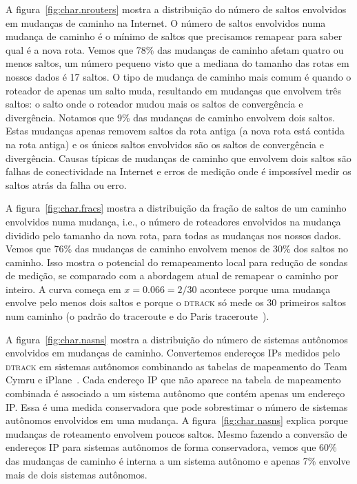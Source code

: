 \documentclass{JBCS}
\newcommand{\dtrack}{\textsc{dtrack}}
\newcommand{\figstr}{figura}
\begin{document}
A \figstr~\ref{fig:char.nrouters} mostra a distribuição do número de
saltos envolvidos em mudanças de caminho na Internet.  O número de
saltos envolvidos numa mudança de caminho é o mínimo de saltos que
precisamos remapear para saber qual é a nova rota.  Vemos que 78\% das
mudanças de caminho afetam quatro ou menos saltos, um número pequeno
visto que a mediana do tamanho das rotas em nossos dados é 17 saltos.  O
tipo de mudança de caminho mais comum é quando o roteador de apenas um
salto muda, resultando em mudanças que envolvem três saltos: o salto
onde o roteador mudou mais os saltos de convergência e divergência.
Notamos que 9\% das mudanças de caminho envolvem dois saltos.  Estas
mudanças apenas removem saltos da rota antiga (a nova rota está contida
na rota antiga) e os únicos saltos envolvidos são os saltos de
convergência e divergência.  Causas típicas de mudanças de caminho que
envolvem dois saltos são falhas de conectividade na Internet e erros de
medição onde é impossível medir os saltos atrás da falha ou erro.  

A \figstr~\ref{fig:char.fracs} mostra a distribuição da fração de saltos
de um caminho envolvidos numa mudança, i.e., o número de roteadores
envolvidos na mudança dividido pelo tamanho da nova rota, para todas as
mudanças nos nossos dados.  Vemos que 76\% das mudanças de caminho
envolvem menos de 30\% dos saltos no caminho.  Isso mostra o potencial
do remapeamento local para redução de sondas de medição, se comparado
com a abordagem atual de remapear o caminho por inteiro.  A curva começa
em $x = 0.066 = 2/30$ acontece porque uma mudança envolve pelo menos
dois saltos e porque o \dtrack{} só mede os 30 primeiros saltos num
caminho (o padrão do traceroute e do Paris
traceroute~\cite{jacobson1989traceroute, augustin07}).

A \figstr~\ref{fig:char.nasns} mostra a distribuição do número de
sistemas autônomos envolvidos em mudanças de caminho.  Convertemos
endereços IPs medidos pelo \dtrack{} em sistemas autônomos combinando as
tabelas de mapeamento do Team Cymru\footnotemark{} e
iPlane~\cite{madhyastha06iplane}.  Cada endereço IP que não aparece na
tabela de mapeamento combinada é associado a um sistema autônomo que
contém apenas um endereço IP.  Essa é uma medida conservadora que pode
sobrestimar o número de sistemas autônomos envolvidos em uma mudança.
A \figstr~\ref{fig:char.nasns} explica porque mudanças de roteamento
envolvem poucos saltos.  Mesmo fazendo a conversão de endereços IP para
sistemas autônomos de forma conservadora, vemos que 60\% das mudanças de
caminho é interna a um sistema autônomo e apenas 7\% envolve mais de
dois sistemas autônomos.
\end{document}
